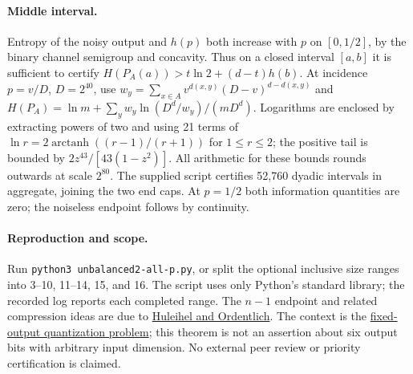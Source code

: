 \documentclass[11pt]{article}
\begin{document}
\paragraph{Middle interval.}
Entropy of the noisy output and $h(p)$ both increase with $p$ on
$[0,1/2]$, by the binary channel semigroup and concavity. Thus on a closed
interval $[a,b]$ it is sufficient to certify
$H(P_A(a))>t\ln2+(d-t)h(b)$. At incidence $p=v/D$, $D=2^{40}$, use
$w_y=\sum_{x\in A} v^{d(x,y)}(D-v)^{d-d(x,y)}$ and
$H(P_A)=\ln m+\sum_y w_y\ln(D^d/w_y)/(mD^d)$.
Logarithms are enclosed by extracting powers of two and using 21 terms
of $\ln r=2\operatorname{arctanh}((r-1)/(r+1))$ for $1\le r\le2$;
the positive tail is bounded by $2z^{43}/[43(1-z^2)]$.
All arithmetic for these bounds rounds outwards at scale $2^{80}$.
The supplied script certifies 52,760 dyadic intervals in aggregate,
joining the two end caps. At $p=1/2$ both information quantities are
zero; the noiseless endpoint follows by continuity.

\paragraph{Reproduction and scope.}
Run \texttt{python3 unbalanced2-all-p.py}, or split the optional inclusive
size ranges into 3--10, 11--14, 15, and 16. The script uses only Python's
standard library; the recorded log reports each completed range.
The $n-1$ endpoint and related compression ideas are due to
\href{https://arxiv.org/abs/1701.03119}{Huleihel and Ordentlich}.
The context is the \href{https://arxiv.org/abs/2609.26444v2}{fixed-output
quantization problem}; this theorem is not an assertion about six output
bits with arbitrary input dimension. No external peer review or priority
certification is claimed.
\end{document}
